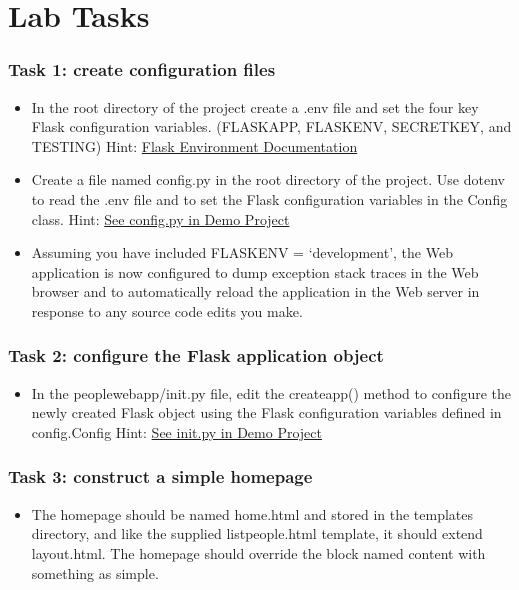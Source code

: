 \documentclass{beamer}
\begin{document}
	\section{Lab Tasks}
	\begin{frame}
		\frametitle{Task 1: create configuration files }
		\begin{itemize}
			\item In the root directory of the project create a .env file and set the four key Flask configuration variables. (FLASK\textunderscore{}APP, FLASK\textunderscore{}ENV, SECRET\textunderscore{}KEY, and TESTING) Hint: \href{https://flask.palletsprojects.com/en/2.0.x/config/#configuring-from-environment-variables}{Flask Environment Documentation}
			\item Create a file named config.py in the root directory of the project. Use dotenv to read the .env file and to set the Flask configuration variables in the Config class. Hint:  \href{https://github.com/martinurschler/2021CompSci235-03-CovidWebApp}{See config.py in Demo Project}
			\item Assuming you have included FLASK\textunderscore{}ENV = ‘development’, the Web application is now configured to dump exception stack traces in the Web browser and to automatically reload the application in the Web server in response to any source code edits you make.
		\end{itemize}
	\end{frame}

	\begin{frame}
		\frametitle{Task 2: configure the Flask application object}
		\begin{itemize}
			\item In the people\textunderscore{}web\textunderscore{}app/\textunderscore{}\textunderscore{}init\textunderscore{}\textunderscore{}.py file, edit the create\textunderscore{}app() method to configure the newly created Flask object using the Flask configuration variables defined in config.Config Hint:  \href{https://github.com/martinurschler/2021CompSci235-03-CovidWebApp}{See \textunderscore{}\textunderscore{}init\textunderscore{}\textunderscore{}.py in Demo Project}
		\end{itemize}
	\end{frame}

	\begin{frame}
		\frametitle{Task 3: construct a simple homepage}
		\begin{itemize}
			\item The homepage should be named home.html and stored in the templates directory, and like the supplied list\textunderscore{}people.html template, it should extend layout.html. The homepage should override the block named content with something as simple.
		\end{itemize}
	\end{frame}
\end{document}
